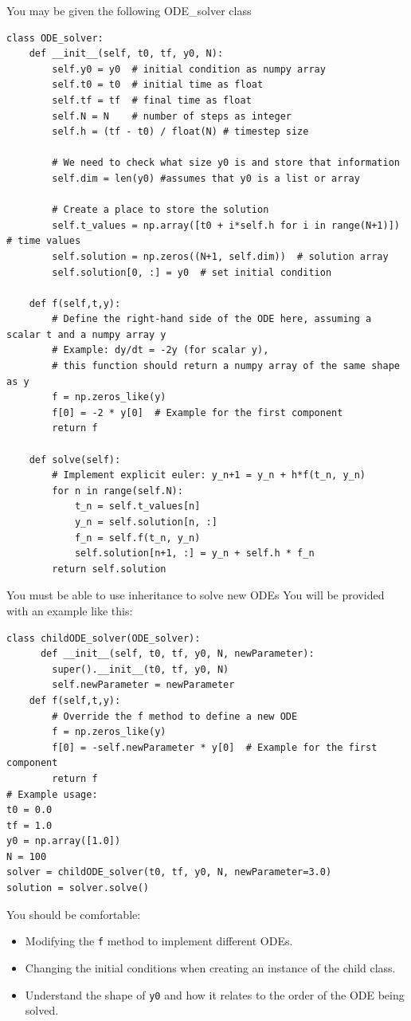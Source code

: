 \documentclass{beamer}
\begin{document}
\begin{frame}[fragile]{You may be given the following ODE\_solver class}
    \begin{verbatim}
class ODE_solver:
    def __init__(self, t0, tf, y0, N):
        self.y0 = y0  # initial condition as numpy array
        self.t0 = t0  # initial time as float
        self.tf = tf  # final time as float
        self.N = N    # number of steps as integer
        self.h = (tf - t0) / float(N) # timestep size

        # We need to check what size y0 is and store that information
        self.dim = len(y0) #assumes that y0 is a list or array

        # Create a place to store the solution
        self.t_values = np.array([t0 + i*self.h for i in range(N+1)])  # time values
        self.solution = np.zeros((N+1, self.dim))  # solution array
        self.solution[0, :] = y0  # set initial condition
        
    def f(self,t,y):
        # Define the right-hand side of the ODE here, assuming a scalar t and a numpy array y
        # Example: dy/dt = -2y (for scalar y),
        # this function should return a numpy array of the same shape as y
        f = np.zeros_like(y)
        f[0] = -2 * y[0]  # Example for the first component
        return f
    
    def solve(self):
        # Implement explicit euler: y_n+1 = y_n + h*f(t_n, y_n)
        for n in range(self.N):
            t_n = self.t_values[n]
            y_n = self.solution[n, :]
            f_n = self.f(t_n, y_n)
            self.solution[n+1, :] = y_n + self.h * f_n
        return self.solution
    \end{verbatim}
\end{frame}

\begin{frame}[fragile]{You must be able to use inheritance to solve new ODEs}
  You will be provided with an example like this:
    \begin{verbatim}
class childODE_solver(ODE_solver):
      def __init__(self, t0, tf, y0, N, newParameter):
        super().__init__(t0, tf, y0, N)
        self.newParameter = newParameter
    def f(self,t,y):
        # Override the f method to define a new ODE
        f = np.zeros_like(y)
        f[0] = -self.newParameter * y[0]  # Example for the first component
        return f
# Example usage:
t0 = 0.0
tf = 1.0
y0 = np.array([1.0])
N = 100
solver = childODE_solver(t0, tf, y0, N, newParameter=3.0)
solution = solver.solve()
\end{verbatim}
  You should be comfortable: 
  \begin{itemize}
  \item Modifying the \texttt{f} method to implement different ODEs.
  \item Changing the initial conditions when creating an instance of the child class.
  \item Understand the shape of \texttt{y0} and how it relates to the order of the ODE being solved.
  \end{itemize}
  \end{frame}
\end{document}
